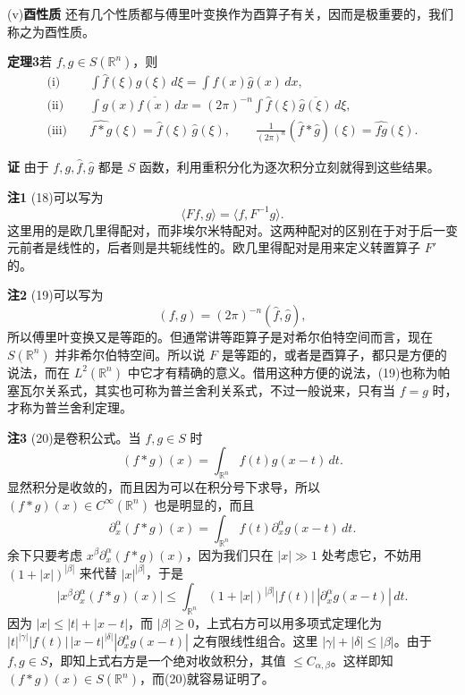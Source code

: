 \noindent(v)\textbf{酉性质}\quad
还有几个性质都与傅里叶变换作为酉算子有关，因而是极重要的，我们称之为酉性质。

\noindent\textbf{定理3}\quad 若 $f,g\in S(\mathbb R^n)$，则
\begin{align}
 \text{(i)}\quad&\int \widehat f(\xi)g(\xi)\,d\xi=\int f(x)\widehat g(x)\,dx,
 \tag{18}\\
 \text{(ii)}\quad&\int g(x)\overline{f(x)}\,dx=(2\pi)^{-n}\int\widehat f(\xi)\overline{\widehat g(\xi)}\,d\xi,
 \tag{19}\\
 \text{(iii)}\quad&\widehat{f*g}(\xi)=\widehat f(\xi)\,\widehat g(\xi),\qquad
 \frac1{(2\pi)^n}(\widehat f*\widehat g)(\xi)=\widehat{fg}(\xi).
 \tag{20}
\end{align}

\noindent\textbf{证}\quad
由于 $f,g,\widehat f,\widehat g$ 都是 $S$ 函数，利用重积分化为逐次积分立刻就得到这些结果。

\noindent\textbf{注1}\quad
(18)可以写为
\[
 \langle Ff,g\rangle=\langle f,F^{-1}g\rangle.
\]
这里用的是欧几里得配对，而非埃尔米特配对。这两种配对的区别在于对于后一变元前者是线性的，后者则是共轭线性的。欧几里得配对是用来定义转置算子 $F'$ 的。

\noindent\textbf{注2}\quad
(19)可以写为
\[
 (f,g)=(2\pi)^{-n}(\widehat f,\widehat g),
\]
所以傅里叶变换又是等距的。但通常讲等距算子是对希尔伯特空间而言，现在 $S(\mathbb R^n)$ 并非希尔伯特空间。所以说 $F$ 是等距的，或者是酉算子，都只是方便的说法，而在 $L^2(\mathbb R^n)$ 中它才有精确的意义。借用这种方便的说法，(19)也称为帕塞瓦尔关系式，其实也可称为普兰舍利关系式，不过一般说来，只有当 $f=g$ 时，才称为普兰舍利定理。

\noindent\textbf{注3}\quad
(20)是卷积公式。当 $f,g\in S$ 时
\[
 (f*g)(x)=\int_{\mathbb R^n}f(t)g(x-t)\,dt.
\]
显然积分是收敛的，而且因为可以在积分号下求导，所以 $(f*g)(x)\in C^\infty(\mathbb R^n)$ 也是明显的，而且
\[
 \partial_x^\alpha(f*g)(x)=\int_{\mathbb R^n}f(t)\partial_x^\alpha g(x-t)\,dt.
\]
余下只要考虑 $x^\beta\partial_x^\alpha(f*g)(x)$，因为我们只在 $|x|\gg1$ 处考虑它，不妨用 $(1+|x|)^{|\beta|}$ 来代替 $|x|^{|\beta|}$，于是
\[
 \bigl|x^\beta\partial_x^\alpha(f*g)(x)\bigr|
 \le\int_{\mathbb R^n}(1+|x|)^{|\beta|}|f(t)|\,|\partial_x^\alpha g(x-t)|\,dt.
\]
因为 $|x|\le|t|+|x-t|$，而 $|\beta|\ge0$，上式右方可以用多项式定理化为 $|t|^{|\gamma|}|f(t)|\,|x-t|^{|\delta|}|\partial_x^\alpha g(x-t)|$ 之有限线性组合。这里 $|\gamma|+|\delta|\le|\beta|$。由于 $f,g\in S$，即知上式右方是一个绝对收敛积分，其值 $\le C_{\alpha,\beta}$。这样即知 $(f*g)(x)\in S(\mathbb R^n)$，而(20)就容易证明了。

